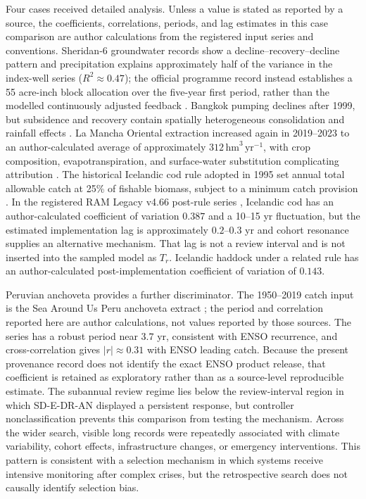 \documentclass[11pt]{article}
\begin{document}
Four cases received detailed analysis. Unless a value is stated as reported by a source, the coefficients, correlations, periods, and lag estimates in this case comparison are author calculations from the registered input series and conventions. Sheridan-6 groundwater records show a decline--recovery--decline pattern and precipitation explains approximately half of the variance in the index-well series ($R^2\approx0.47$); the official programme record instead establishes a 55 acre-inch block allocation over the five-year first period, rather than the modelled continuously adjusted feedback \cite{kwosheridan6}. Bangkok pumping declines after 1999, but subsidence and recovery contain spatially heterogeneous consolidation and rainfall effects \cite{bremard2022,ahmed2024}. La Mancha Oriental extraction increased again in 2019--2023 to an author-calculated average of approximately $312\,\mathrm{hm}^3\,\mathrm{yr}^{-1}$, with crop composition, evapotranspiration, and surface-water substitution complicating attribution \cite{hoogesteger2025}. The historical Icelandic cod rule adopted in 1995 set annual total allowable catch at 25\% of fishable biomass, subject to a minimum catch provision \cite{danielsson1997}. In the registered RAM Legacy v4.66 post-rule series \cite{ram2024}, Icelandic cod has an author-calculated coefficient of variation $0.387$ and a 10--15 yr fluctuation, but the estimated implementation lag is approximately $0.2$--$0.3$ yr and cohort resonance supplies an alternative mechanism. That lag is not a review interval and is not inserted into the sampled model as $T_r$. Icelandic haddock under a related rule has an author-calculated post-implementation coefficient of variation of $0.143$.

Peruvian anchoveta provides a further discriminator. The 1950--2019 catch input is the Sea Around Us Peru anchoveta extract \cite{pauly2020,zeller2016}; the period and correlation reported here are author calculations, not values reported by those sources. The series has a robust period near $3.7$ yr, consistent with ENSO recurrence, and cross-correlation gives $|r|\approx0.31$ with ENSO leading catch. Because the present provenance record does not identify the exact ENSO product release, that coefficient is retained as exploratory rather than as a source-level reproducible estimate. The subannual review regime lies below the review-interval region in which SD-E-DR-AN displayed a persistent response, but controller nonclassification prevents this comparison from testing the mechanism. Across the wider search, visible long records were repeatedly associated with climate variability, cohort effects, infrastructure changes, or emergency interventions. This pattern is consistent with a selection mechanism in which systems receive intensive monitoring after complex crises, but the retrospective search does not causally identify selection bias.
\end{document}
